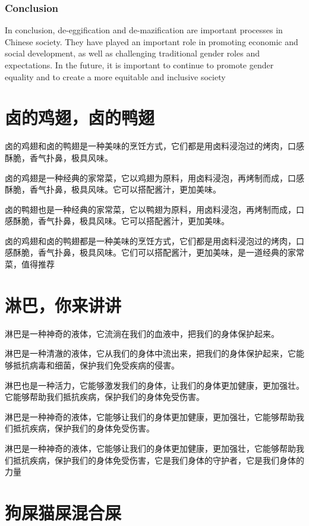 \documentclass[titlepage,oneside]{ctexbook}
\begin{document}
\subsection*{Conclusion}

In conclusion, de-eggification and de-mazification are important processes in Chinese society. They have played an important role in promoting economic and social development, as well as challenging traditional gender roles and expectations. In the future, it is important to continue to promote gender equality and to create a more equitable and inclusive society

\chapter{卤的鸡翅，卤的鸭翅}
卤的鸡翅和卤的鸭翅是一种美味的烹饪方式，它们都是用卤料浸泡过的烤肉，口感酥脆，香气扑鼻，极具风味。

卤的鸡翅是一种经典的家常菜，它以鸡翅为原料，用卤料浸泡，再烤制而成，口感酥脆，香气扑鼻，极具风味。它可以搭配酱汁，更加美味。

卤的鸭翅也是一种经典的家常菜，它以鸭翅为原料，用卤料浸泡，再烤制而成，口感酥脆，香气扑鼻，极具风味。它可以搭配酱汁，更加美味。

卤的鸡翅和卤的鸭翅都是一种美味的烹饪方式，它们都是用卤料浸泡过的烤肉，口感酥脆，香气扑鼻，极具风味。它们可以搭配酱汁，更加美味，是一道经典的家常菜，值得推荐


\chapter{淋巴，你来讲讲}

淋巴是一种神奇的液体，它流淌在我们的血液中，把我们的身体保护起来。

淋巴是一种清澈的液体，它从我们的身体中流出来，把我们的身体保护起来，它能够抵抗病毒和细菌，保护我们免受疾病的侵害。

淋巴也是一种活力，它能够激发我们的身体，让我们的身体更加健康，更加强壮。它能够帮助我们抵抗疾病，保护我们的身体免受伤害。

淋巴是一种神奇的液体，它能够让我们的身体更加健康，更加强壮，它能够帮助我们抵抗疾病，保护我们的身体免受伤害。

淋巴是一种神奇的液体，它能够让我们的身体更加健康，更加强壮，它能够帮助我们抵抗疾病，保护我们的身体免受伤害，它是我们身体的守护者，它是我们身体的力量

\chapter{狗屎猫屎混合屎}
\end{document}
